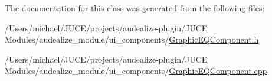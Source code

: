 The documentation for this class was generated from the following files\+:\begin{DoxyCompactItemize}
\item 
/\+Users/michael/\+J\+U\+C\+E/projects/audealize-\/plugin/\+J\+U\+C\+E Modules/audealize\+\_\+module/ui\+\_\+components/\hyperlink{_graphic_e_q_component_8h}{Graphic\+E\+Q\+Component.\+h}\item 
/\+Users/michael/\+J\+U\+C\+E/projects/audealize-\/plugin/\+J\+U\+C\+E Modules/audealize\+\_\+module/ui\+\_\+components/\hyperlink{_graphic_e_q_component_8cpp}{Graphic\+E\+Q\+Component.\+cpp}\end{DoxyCompactItemize}
